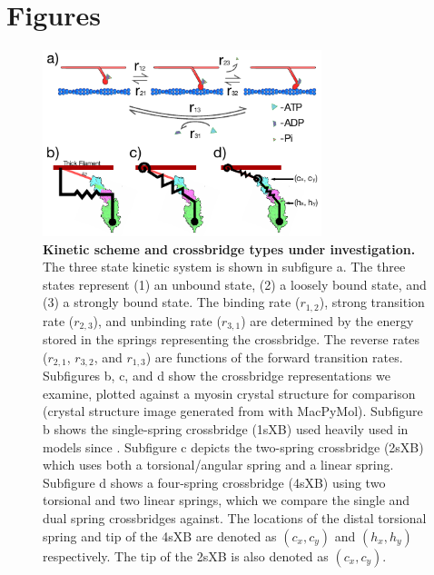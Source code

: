 \documentclass[]{article}
\begin{document}


\clearpage
\section*{Figures} %

\begin{figure}[htbp]
    \begin{center}
    \includegraphics[width=3.2in]{../imgs/Figure1.pdf}
    \caption{
        \label{fig_xb_types}
        \textbf{Kinetic scheme and crossbridge types under investigation.} 
        The three state kinetic system is shown in subfigure a. 
        The three states represent (1) an unbound state, (2) a loosely bound state, and (3) a strongly bound state. 
        The binding rate ($r_{1,2}$), strong transition rate ($r_{2,3}$), and unbinding rate ($r_{3,1}$) are determined by the energy stored in the springs representing the crossbridge. 
        The reverse rates ($r_{2,1}$, $r_{3,2}$, and $r_{1,3}$) are functions of the forward transition rates.
        Subfigures b, c, and d show the crossbridge representations we examine, plotted against a myosin crystal structure for comparison (crystal structure image generated from \citet{Gourinath2003} with MacPyMol). 
        Subfigure b shows the single-spring crossbridge (1sXB) used heavily used in models since \protect\citep{Huxley1957}. 
        Subfigure c depicts the two-spring crossbridge (2sXB) which uses both a torsional/angular spring and a linear spring. 
        Subfigure d shows a four-spring crossbridge (4sXB) using two torsional and two linear springs, which we compare the single and dual spring crossbridges against.
        The locations of the distal torsional spring and tip of the 4sXB are denoted as $(c_x, c_y)$ and $(h_x, h_y)$ respectively. 
        The tip of the 2sXB is also denoted as $(c_x, c_y)$.
    }
    \end{center}
\end{figure}
\end{document}
